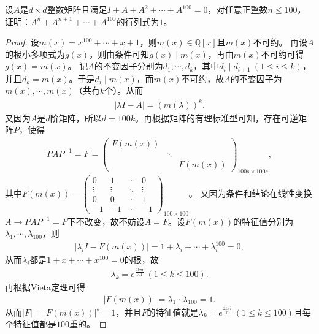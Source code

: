 \documentclass[../../main.tex]{subfiles}%
\begin{document}
\begin{example}
设$A$是$d\times d$整数矩阵且满足$I + A + A^2 + \cdots + A^{100} = 0$，对任意正整数$n \leqslant  100$，证明：$A^n + A^{n + 1} + \cdots + A^{100}$的行列式为$1$。 
\end{example}
\begin{proof}
设$m(x) = x^{100}+\cdots + x + 1$，则$m(x)\in \mathbb{Q}[x]$且$m(x)$不可约。
再设$A$的极小多项式为$g(x)$，则由条件可知$g(x)\mid m(x)$，再由$m(x)$不可约可得$g(x)=m(x)$。
记$A$的不变因子分别为$d_1,\cdots,d_k$，其中$d_i\mid d_{i + 1}\ (1\leqslant i\leqslant k)$，并且$d_k = m(x)$。于是$d_i\mid m(x)$，而$m(x)$不可约，故$A$的不变因子为$m(x),\cdots,m(x)$（共有$k$个）。从而
\begin{align*}
|\lambda I - A| = (m(\lambda))^k.
\end{align*}
又因为$A$是$d$阶矩阵，所以$d = 100k$。再根据矩阵的有理标准型可知，存在可逆矩阵$P$，使得
\begin{align*}
PAP^{-1} = F = \begin{pmatrix}
F(m(x)) & & \\
& \ddots & \\
& & F(m(x))
\end{pmatrix}_{100s\times 100s},
\end{align*}
其中$F(m(x)) = \begin{pmatrix}
0 & 1 & \cdots & 0 \\
\vdots & \vdots & \ddots & \vdots \\
0 & 0 & \cdots & 1 \\
-1 & -1 & \cdots & -1
\end{pmatrix}_{100\times 100}$。
又因为条件和结论在线性变换$A\rightarrow PAP^{-1}=F$下不改变，故不妨设$A = F$。设$F(m(x))$的特征值分别为$\lambda_1,\cdots,\lambda_{100}$，则
\begin{align*}
|\lambda_i I - F(m(x))| = 1 + \lambda_i + \cdots + \lambda_i^{100} = 0,
\end{align*}
从而$\lambda_i$都是$1 + x + \cdots + x^{100} = 0$的根，故
\begin{align}
\lambda_k = e^{\frac{2k\pi \mathrm{i}}{101}}\ (1\leqslant k\leqslant 100). \label{100.50}
\end{align}
再根据Vieta定理可得
\begin{align*}
|F(m(x))| = \lambda_1\cdots \lambda_{100} = 1.
\end{align*}
从而$|F| = |F(m(x))|^s = 1$，并且$F$的特征值就是$\lambda_k = e^{\frac{2k\pi \mathrm{i}}{101}}\ (1\leqslant k\leqslant 100)$且每个特征值都是$100$重的。


\end{proof}
\end{document}
